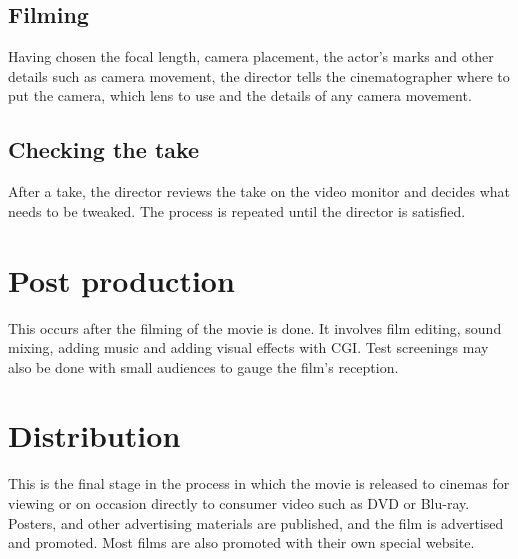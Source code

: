 \documentclass{article}
\begin{document}
\subsection{Filming}
Having chosen the focal length, camera placement, the actor’s marks and other details such as camera movement, the director tells the cinematographer where to put the camera, which lens to use and the details of any camera movement.

\subsection{Checking the take}
After a take, the director reviews the take on the video monitor and decides what needs to be tweaked. The process is repeated until the director is satisfied.

\section{Post production}
This occurs after the filming of the movie is done. It involves film editing, sound mixing, adding music and adding visual effects with CGI. Test screenings may also be done with small audiences to gauge the film’s reception.

\section{Distribution}
This is the final stage in the process in which the movie is released to cinemas for viewing or on occasion directly to consumer video such as DVD or Blu-ray. Posters, and other advertising materials are published, and the film is advertised and promoted.  Most films are also promoted with their own special website.
\end{document}
